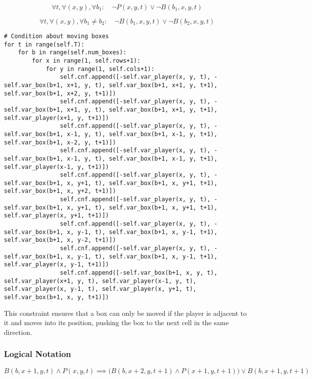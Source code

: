 \documentclass[12pt,a4paper]{article}
\begin{document}
\[
\forall t, \forall (x,y), \forall b_1: \quad \neg P(x,y,t) \lor \neg B(b_1,x,y,t)
\]

\[
\forall t, \forall (x,y), \forall b_1 \neq b_2: \quad \neg B(b_1,x,y,t) \lor \neg B(b_2,x,y,t)
\]

\newpage


\begin{lstlisting}
# Condition about moving boxes
for t in range(self.T):
    for b in range(self.num_boxes):
        for x in range(1, self.rows+1):
            for y in range(1, self.cols+1):
                self.cnf.append([-self.var_player(x, y, t), -self.var_box(b+1, x+1, y, t), self.var_box(b+1, x+1, y, t+1), self.var_box(b+1, x+2, y, t+1)])
                self.cnf.append([-self.var_player(x, y, t), -self.var_box(b+1, x+1, y, t), self.var_box(b+1, x+1, y, t+1), self.var_player(x+1, y, t+1)])
                self.cnf.append([-self.var_player(x, y, t), -self.var_box(b+1, x-1, y, t), self.var_box(b+1, x-1, y, t+1), self.var_box(b+1, x-2, y, t+1)])
                self.cnf.append([-self.var_player(x, y, t), -self.var_box(b+1, x-1, y, t), self.var_box(b+1, x-1, y, t+1), self.var_player(x-1, y, t+1)])
                self.cnf.append([-self.var_player(x, y, t), -self.var_box(b+1, x, y+1, t), self.var_box(b+1, x, y+1, t+1), self.var_box(b+1, x, y+2, t+1)])
                self.cnf.append([-self.var_player(x, y, t), -self.var_box(b+1, x, y+1, t), self.var_box(b+1, x, y+1, t+1), self.var_player(x, y+1, t+1)])
                self.cnf.append([-self.var_player(x, y, t), -self.var_box(b+1, x, y-1, t), self.var_box(b+1, x, y-1, t+1), self.var_box(b+1, x, y-2, t+1)])
                self.cnf.append([-self.var_player(x, y, t), -self.var_box(b+1, x, y-1, t), self.var_box(b+1, x, y-1, t+1), self.var_player(x, y-1, t+1)])
                self.cnf.append([-self.var_box(b+1, x, y, t), self.var_player(x+1, y, t), self.var_player(x-1, y, t), self.var_player(x, y-1, t), self.var_player(x, y+1, t), self.var_box(b+1, x, y, t+1)])
\end{lstlisting}

This constraint ensures that a box can only be moved if the player is adjacent to it and moves into its position, pushing the box to the next cell in the same direction.

\subsubsection*{Logical Notation}

\[
B(b,x+1,y,t) \wedge P(x,y,t) \implies \bigl(B(b,x+2,y,t+1) \wedge P(x+1,y,t+1)\bigr) \vee B(b,x+1,y,t+1)
\]
\end{document}

